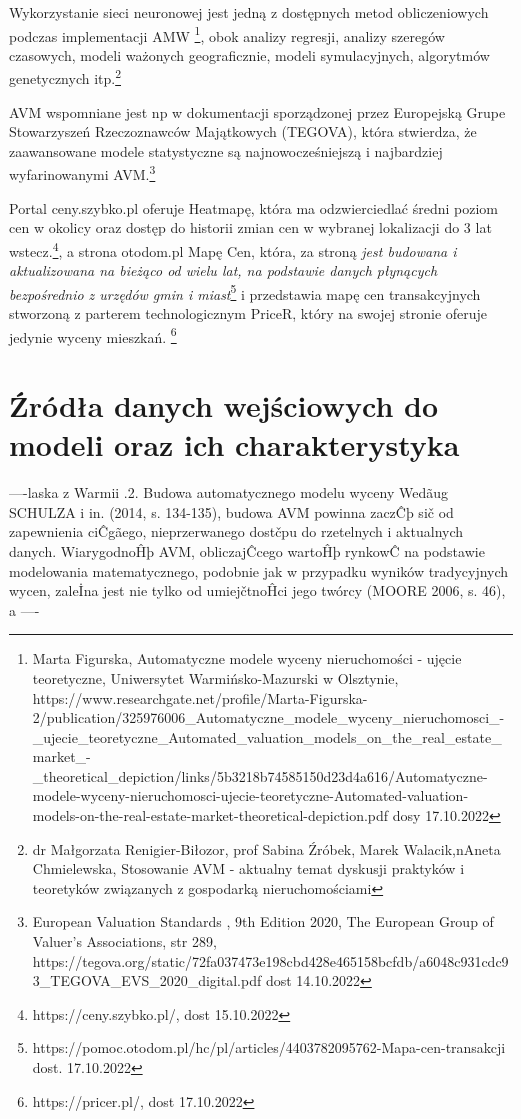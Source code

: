 \documentclass[a4paper,12pt,twoside,openany]{report}
\begin{document}
Wykorzystanie sieci neuronowej jest jedną z dostępnych metod obliczeniowych podczas implementacji AMW \footnote{Marta Figurska, Automatyczne modele wyceny nieruchomości - ujęcie teoretyczne, Uniwersytet Warmińsko-Mazurski w Olsztynie,
https://www.researchgate.net/profile/Marta-Figurska-2/publication/325976006\_Automatyczne\_modele\_wyceny\_nieruchomosci\_-\_ujecie\_teoretyczne\_Automated\_valuation\_models\_on\_the\_real\_estate\_market\_-\_theoretical\_depiction/links/5b3218b74585150d23d4a616/Automatyczne-modele-wyceny-nieruchomosci-ujecie-teoretyczne-Automated-valuation-models-on-the-real-estate-market-theoretical-depiction.pdf dosy 17.10.2022}, obok analizy regresji, analizy szeregów czasowych, modeli ważonych geograficznie, modeli symulacyjnych, algorytmów genetycznych itp.\footnote{dr Małgorzata Renigier-Biłozor, prof Sabina Źróbek,  Marek Walacik,nAneta Chmielewska, Stosowanie AVM - aktualny temat dyskusji
praktyków i teoretyków związanych z gospodarką nieruchomościami}

AVM wspomniane jest np w dokumentacji sporządzonej przez Europejską Grupe Stowarzyszeń Rzeczoznawców Majątkowych (TEGOVA), która stwierdza, że zaawansowane modele statystyczne są najnowocześniejszą i najbardziej wyfarinowanymi AVM.\footnote{European Valuation Standards , 9th Edition 2020, The European Group of Valuer's Associations, str 289, https://tegova.org/static/72fa037473e198cbd428e465158bcfdb/a6048c931cdc93\_TEGOVA\_EVS\_2020\_digital.pdf dost 14.10.2022} 


Portal ceny.szybko.pl oferuje Heatmapę, która ma odzwierciedlać średni poziom cen w okolicy oraz dostęp do historii zmian cen w wybranej lokalizacji do 3 lat wstecz.\footnote{https://ceny.szybko.pl/, dost 15.10.2022}, a strona otodom.pl Mapę Cen, która, za stroną \textit{jest budowana i aktualizowana na bieżąco od wielu lat, na podstawie danych płynących bezpośrednio z urzędów gmin i miast}\footnote{https://pomoc.otodom.pl/hc/pl/articles/4403782095762-Mapa-cen-transakcji dost. 17.10.2022} i przedstawia mapę cen transakcyjnych stworzoną z parterem technologicznym PriceR, który na swojej stronie  oferuje jedynie wyceny mieszkań. \footnote{https://pricer.pl/, dost 17.10.2022}





\chapter{Źródła danych wejściowych do modeli oraz ich charakterystyka}
 ----laska z Warmii 
 .2. Budowa automatycznego modelu wyceny
Wedãug SCHULZA i in. (2014, s. 134-135), budowa AVM powinna zaczĈþ sič od zapewnienia ciĈgãego,
nieprzerwanego dostčpu do rzetelnych i aktualnych danych. WiarygodnoĤþ AVM, obliczajĈcego
wartoĤþ rynkowĈ na podstawie modelowania matematycznego, podobnie jak w przypadku wyników
tradycyjnych wycen, zaleİna jest nie tylko od umiejčtnoĤci jego twórcy (MOORE 2006, s. 46), a
 ----
\end{document}
